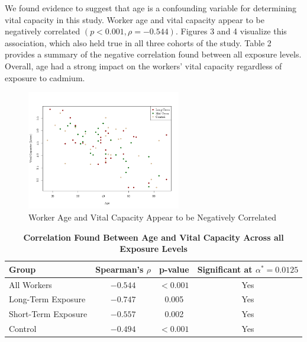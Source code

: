 \documentclass{article}
\begin{document}
		We found evidence to suggest that age is a confounding variable for determining vital capacity in this study. Worker age and vital capacity appear to be negatively correlated $(p < 0.001, \rho = -0.544)$. Figures 3 and 4 visualize this association, which also held true in all three cohorts of the study. Table 2 provides a summary of the negative correlation found between all exposure levels. Overall, age had a strong impact on the workers’ vital capacity regardless of exposure to cadmium.

		\begin{figure}[h!]
			\centering
			\includegraphics[width=0.6\textwidth]{graphs/ScatterAll.png}
			\caption{Worker Age and Vital Capacity Appear to be Negatively Correlated}
			\label{fig:histogram}
		\end{figure}

		\begin{table}[h!]
			\centering
			\footnotesize
			\caption{\textbf{Correlation Found Between Age and Vital Capacity Across all Exposure Levels}}
			\begin{tabular}{lccc}
				\toprule
				\textbf{Group} & \textbf{Spearman’s $\rho$} & \textbf{p-value} & \textbf{Significant at $\alpha^* = 0.0125$ }  \\
				\midrule
				All Workers & $-0.544$ & $<0.001$ & Yes \\
				Long-Term Exposure & $-0.747$ & 0.005 & Yes \\
				Short-Term Exposure & $-0.557$ & 0.002 & Yes \\
				Control & $-0.494$ & $<0.001$ & Yes \\
				\bottomrule
			\end{tabular}
		\end{table}
\end{document}
